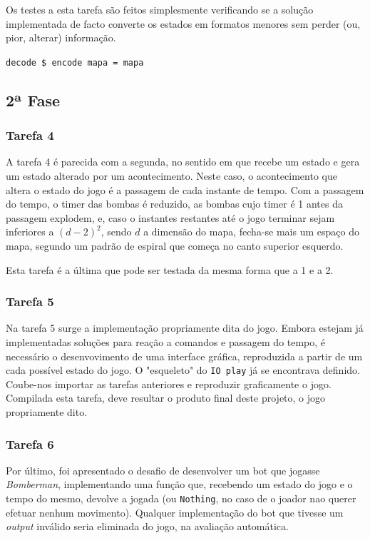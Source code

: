 \documentclass[a4paper]{article}
\begin{document}
    Os testes a esta tarefa são feitos simplesmente verificando se a solução implementada de facto
    converte os estados em formatos menores sem perder (ou, pior, alterar) informação. 
    \begin{center}
    \texttt{decode \$ encode mapa = mapa}
    \end{center}

\pagebreak










\subsection{2ª Fase}

\subsubsection{Tarefa 4}
    \hspace{0.54cm}A tarefa 4 é parecida com a segunda, no sentido em que recebe um estado e gera um estado alterado
    por um acontecimento. Neste caso, o acontecimento que altera o estado do jogo é a passagem de cada 
    instante de tempo.
    Com a passagem do tempo, o timer das bombas é reduzido, as bombas cujo timer é 1 antes da passagem
    explodem, e, caso o instantes restantes até o jogo terminar sejam inferiores a $(d-2)^2$, sendo 
    $d$ a dimensão do mapa, fecha-se mais um espaço do mapa, segundo um padrão de espiral que começa
    no canto superior esquerdo.

    Esta tarefa é a última que pode ser testada da mesma forma que a 1 e a 2.


\subsubsection{Tarefa 5}
    \hspace{0.54cm}Na tarefa 5 surge a implementação propriamente dita do jogo. Embora estejam já implementadas
    soluções para reação a comandos e passagem do tempo, é necessário o desenvovimento de uma 
    interface gráfica, reproduzida a partir de um cada possível estado do jogo. O "esqueleto"
    do \texttt{IO play} já se encontrava definido. Coube-nos importar as tarefas anteriores e 
    reproduzir graficamente o jogo. Compilada esta tarefa, deve resultar o produto final deste projeto,
    o jogo propriamente dito. 


\subsubsection{Tarefa 6}
    \hspace{0.54cm}Por último, foi apresentado o desafio de desenvolver um bot que jogasse \textit{Bomberman}, 
    implementando uma função que, recebendo um estado do jogo e o tempo do mesmo, devolve a
    jogada (ou \texttt{Nothing}, no caso de o joador nao querer efetuar nenhum movimento).
    Qualquer implementação do bot que tivesse um \textit{output} inválido seria eliminada do jogo, 
    na avaliação automática.
    
\end{document}
